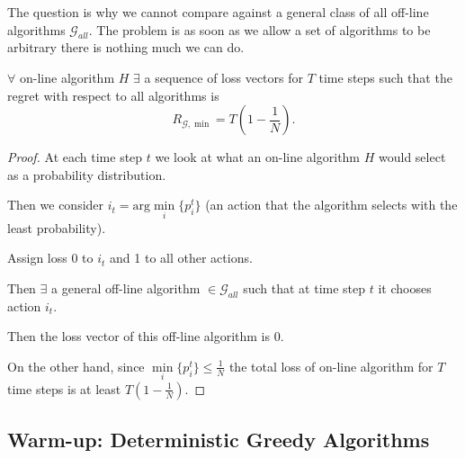 The question is why we cannot compare against a general class of all off-line algorithms $\mathcal{G}_{all}$. The problem is as soon as we allow a set of algorithms to be arbitrary there is nothing much we can do.
\begin{theorem}
$\forall$ on-line algorithm $H$ $\exists$ a sequence of loss vectors for $T$ time steps such that the regret with respect to all algorithms is
$$
R_{\mathcal{G},\min}=T\left(1-\frac{1}{N}\right).
$$ 
\end{theorem}
\begin{proof}
At each time step $t$ we look at what an on-line algorithm $H$ would select as a probability distribution.

Then we consider $i_t=\text{arg}\min\limits_i\{p^t_i\}$ (an action that the algorithm selects with the least probability). 

Assign loss 0 to $i_t$ and 1 to all other actions.

Then $\exists$ a general off-line algorithm $\in\mathcal{G}_{all}$ such that at time step $t$ it chooses action $i_t$.

Then the loss vector of this off-line algorithm is 0.

On the other hand, since $\min\limits_i\{p^t_i\}\leqslant\frac{1}{N}$ the total loss of on-line algorithm for $T$ time steps is at least $T\left(1-\frac{1}{N}\right)$.
\end{proof}
\subsection{Warm-up: Deterministic Greedy Algorithms}

